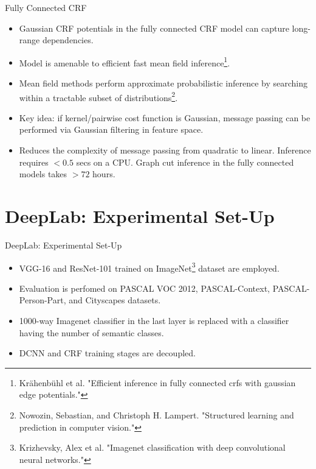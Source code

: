 \documentclass{beamer}
\begin{document}
\begin{frame}{Fully Connected CRF}
\begin{itemize}
	\item<1-> Gaussian CRF potentials in the {\color{blue}fully connected CRF} model can capture long-range dependencies.
	\item<2-> Model is amenable to efficient fast {\color{blue}mean field inference}\footnote{Krähenbühl et al. "Efficient inference in fully connected crfs with gaussian edge potentials."}.
	\item<3-> Mean field methods perform {\color{blue}approximate probabilistic inference} by searching within a tractable subset of distributions\footnote{Nowozin, Sebastian, and Christoph H. Lampert. "Structured learning and prediction in computer vision."}.
	\item<4-> Key idea: if {\color{blue}kernel/pairwise cost function} is Gaussian, {\color{blue}message passing} can be performed via Gaussian filtering in feature space.
	\item<5-> Reduces the complexity of message passing from quadratic to {\color{blue} linear}. Inference requires  $<0.5$ secs on a CPU. {\color{red}Graph cut inference} in the fully connected models takes $>72$ hours.
\end{itemize}
\end{frame}

\section{DeepLab: Experimental Set-Up }
\begin{frame}{DeepLab: Experimental Set-Up }
\begin{itemize}
	\item VGG-16 and ResNet-101 trained on ImageNet\footnote{Krizhevsky, Alex et al. "Imagenet classification with deep convolutional neural networks."} dataset are employed.
	\item<2-> Evaluation is perfomed on {\color{blue}PASCAL VOC 2012}, {\color{blue}PASCAL-Context}, 	{\color{blue}PASCAL-Person-Part}, and {\color{blue}Cityscapes datasets}.  \onslide<2->
	\item<3-> 1000-way Imagenet classifier in the last layer is replaced with a classifier having the number of semantic classes.\onslide<3->
	\item<4-> DCNN and CRF training stages are decoupled.  
\end{itemize}
\end{frame}
\end{document}
